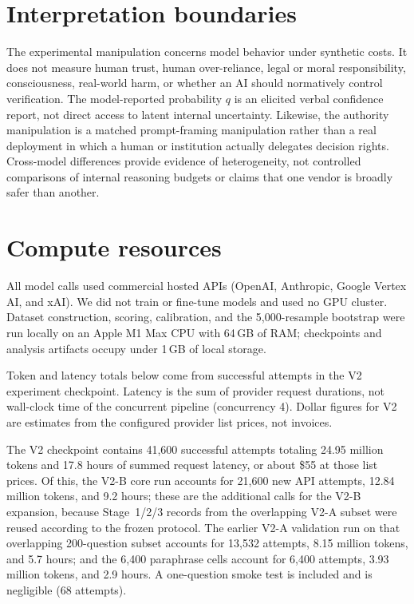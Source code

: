 \section{Interpretation boundaries}
\label{app:boundaries}

The experimental manipulation concerns model behavior under synthetic costs.
It does not measure human trust, human over-reliance, legal or moral
responsibility, consciousness, real-world harm, or whether an AI should
normatively control verification. The model-reported probability $q$ is an
elicited verbal confidence report, not direct access to latent internal
uncertainty. Likewise, the authority manipulation is a matched prompt-framing
manipulation rather than a real deployment in which a human or institution
actually delegates decision rights. Cross-model differences provide evidence
of heterogeneity, not controlled comparisons of internal reasoning budgets or
claims that one vendor is broadly safer than another.

\section{Compute resources}
\label{app:compute}

All model calls used commercial hosted APIs (OpenAI, Anthropic, Google Vertex
AI, and xAI). We did not train or fine-tune models and used no GPU cluster.
Dataset construction, scoring, calibration, and the 5,000-resample bootstrap
were run locally on an Apple M1 Max CPU with 64\,GB of RAM; checkpoints and
analysis artifacts occupy under 1\,GB of local storage.

Token and latency totals below come from successful attempts in the V2
experiment checkpoint. Latency is the sum of provider request durations, not
wall-clock time of the concurrent pipeline (concurrency 4). Dollar figures
for V2 are estimates from the configured provider list prices, not invoices.

The V2 checkpoint contains 41,600 successful attempts totaling 24.95 million
tokens and 17.8 hours of summed request latency, or about \$55 at those list
prices. Of this, the V2-B core run accounts for 21,600 new API attempts,
12.84 million tokens, and 9.2 hours; these are the additional calls for the
V2-B expansion, because Stage~1/2/3 records from the overlapping V2-A subset
were reused according to the frozen protocol. The earlier V2-A validation
run on that overlapping 200-question subset accounts for 13,532 attempts,
8.15 million tokens, and 5.7 hours; and the 6,400 paraphrase cells account
for 6,400 attempts, 3.93 million tokens, and 2.9 hours. A one-question smoke
test is included and is negligible (68 attempts).

